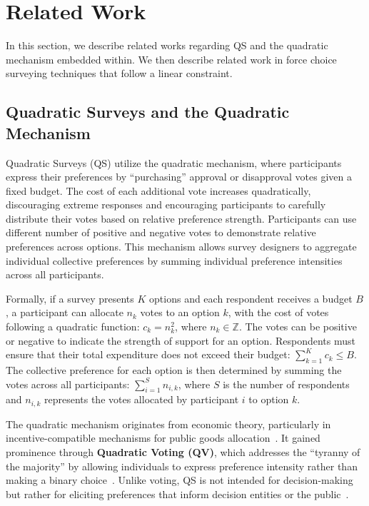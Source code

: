 \section{Related Work}
\label{sec:relatedWorks}
In this section, we describe related works regarding QS and the quadratic mechanism embedded within. We then describe related work in force choice surveying techniques that follow a linear constraint.

\subsection{Quadratic Surveys and the Quadratic Mechanism}
Quadratic Surveys (QS) utilize the quadratic mechanism, where participants express their preferences by ``purchasing'' approval or disapproval votes given a fixed budget. The cost of each additional vote increases quadratically, discouraging extreme responses and encouraging participants to carefully distribute their votes based on relative preference strength. Participants can use different number of positive and negative votes to demonstrate relative preferences across options. This mechanism allows survey designers to aggregate individual collective preferences by summing individual preference intensities across all participants.

Formally, if a survey presents $K$ options and each respondent receives a budget $B$, a participant can allocate $n_k$ votes to an option $k$, with the cost of votes following a quadratic function: $c_k = n_k^2$, where $n_k \in \mathbb{Z}$. The votes can be positive or negative to indicate the strength of support for an option. Respondents must ensure that their total expenditure does not exceed their budget: $\sum_{k=1}^{K} c_k \leq B$. The collective preference for each option is then determined by summing the votes across all participants: $\sum_{i=1}^{S} n_{i,k}$, where $S$ is the number of respondents and $n_{i,k}$ represents the votes allocated by participant $i$ to option $k$.

The quadratic mechanism originates from economic theory, particularly in incentive-compatible mechanisms for public goods allocation~\cite{grovesOptimalAllocationPublic1977}. It gained prominence through \textbf{Quadratic Voting (QV)}, which addresses the ``tyranny of the majority'' by allowing individuals to express preference intensity rather than making a binary choice~\cite{posner2018radical}. Unlike voting, QS is not intended for decision-making but rather for eliciting preferences that inform decision entities or the public~\cite{chengOrganizeThenVote2025}.

